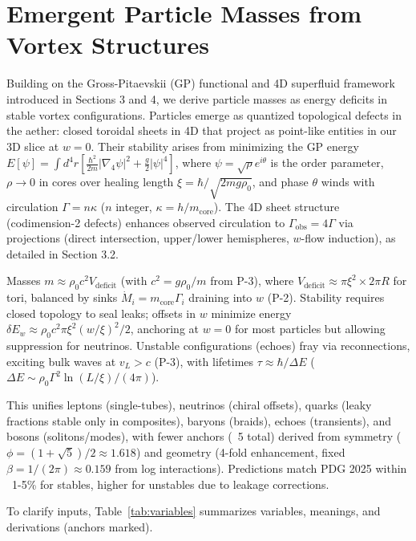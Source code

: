 \documentclass{article}
\begin{document}
\section{Emergent Particle Masses from Vortex Structures}

Building on the Gross-Pitaevskii (GP) functional and 4D superfluid framework introduced in Sections 3 and 4, we derive particle masses as energy deficits in stable vortex configurations. Particles emerge as quantized topological defects in the aether: closed toroidal sheets in 4D that project as point-like entities in our 3D slice at $w=0$. Their stability arises from minimizing the GP energy $E[\psi] = \int d^4 r \left[ \frac{\hbar^2}{2 m} |\nabla_4 \psi|^2 + \frac{g}{2} |\psi|^4 \right]$, where $\psi = \sqrt{\rho} e^{i \theta}$ is the order parameter, $\rho \to 0$ in cores over healing length $\xi = \hbar / \sqrt{2 m g \rho_0}$, and phase $\theta$ winds with circulation $\Gamma = n \kappa$ ($n$ integer, $\kappa = h / m_{\text{core}}$). The 4D sheet structure (codimension-2 defects) enhances observed circulation to $\Gamma_{\text{obs}} = 4\Gamma$ via projections (direct intersection, upper/lower hemispheres, $w$-flow induction), as detailed in Section 3.2.

Masses $m \approx \rho_0 c^2 V_{\text{deficit}}$ (with $c^2 = g \rho_0 / m$ from P-3), where $V_{\text{deficit}} \approx \pi \xi^2 \times 2\pi R$ for tori, balanced by sinks $\dot{M}_i = m_{\text{core}} \Gamma_i$ draining into $w$ (P-2). Stability requires closed topology to seal leaks; offsets in $w$ minimize energy $\delta E_w \approx \rho_0 c^2 \pi \xi^2 (w / \xi)^2 / 2$, anchoring at $w=0$ for most particles but allowing suppression for neutrinos. Unstable configurations (echoes) fray via reconnections, exciting bulk waves at $v_L > c$ (P-3), with lifetimes $\tau \approx \hbar / \Delta E$ ($\Delta E \sim \rho_0 \Gamma^2 \ln(L / \xi) / (4\pi)$).

This unifies leptons (single-tubes), neutrinos (chiral offsets), quarks (leaky fractions stable only in composites), baryons (braids), echoes (transients), and bosons (solitons/modes), with fewer anchors (~5 total) derived from symmetry ($\phi = (1 + \sqrt{5})/2 \approx 1.618$) and geometry (4-fold enhancement, fixed $\beta = 1/(2\pi) \approx 0.159$ from log interactions). Predictions match PDG 2025 within ~1-5\% for stables, higher for unstables due to leakage corrections.

To clarify inputs, Table~\ref{tab:variables} summarizes variables, meanings, and derivations (anchors marked).
\end{document}
